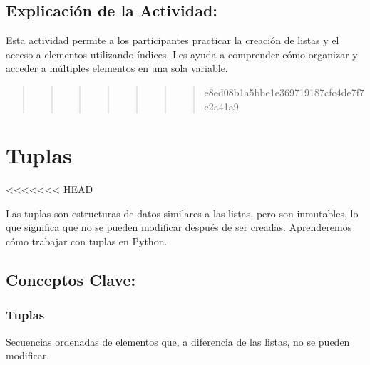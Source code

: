 \documentclass[
  a4paper,
  DIV=11,
  numbers=noendperiod,
  onepage,
  openany]{scrreprt}
\begin{document}
\hypertarget{explicaciuxf3n-de-la-actividad-17}{%
\section{Explicación de la
Actividad:}\label{explicaciuxf3n-de-la-actividad-17}}

Esta actividad permite a los participantes practicar la creación de
listas y el acceso a elementos utilizando índices. Les ayuda a
comprender cómo organizar y acceder a múltiples elementos en una sola
variable.

\begin{quote}
\begin{quote}
\begin{quote}
\begin{quote}
\begin{quote}
\begin{quote}
\begin{quote}
e8ed08b1a5bbe1e369719187cfc4de7f7e2a41a9
\end{quote}
\end{quote}
\end{quote}
\end{quote}
\end{quote}
\end{quote}
\end{quote}

\hypertarget{tuplas}{%
\chapter{Tuplas}\label{tuplas}}

\textless\textless\textless\textless\textless\textless\textless{} HEAD

Las tuplas son estructuras de datos similares a las listas, pero son
inmutables, lo que significa que no se pueden modificar después de ser
creadas. Aprenderemos cómo trabajar con tuplas en Python.

\hypertarget{conceptos-clave-20}{%
\section{Conceptos Clave:}\label{conceptos-clave-20}}

\hypertarget{tuplas-1}{%
\subsection{Tuplas}\label{tuplas-1}}

Secuencias ordenadas de elementos que, a diferencia de las listas, no se
pueden modificar.
\end{document}
